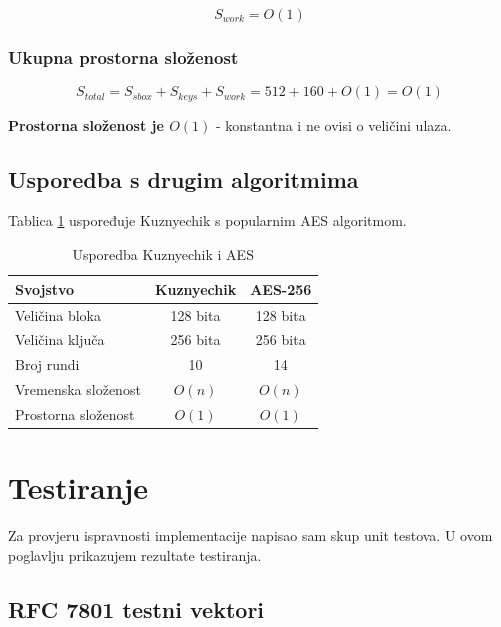\documentclass[12pt,a4paper]{article}
\begin{document}
\begin{equation}
    S_{work} = O(1)
\end{equation}

\subsubsection{Ukupna prostorna složenost}

\begin{equation}
    S_{total} = S_{sbox} + S_{keys} + S_{work} = 512 + 160 + O(1) = O(1)
\end{equation}

\textbf{Prostorna složenost je $O(1)$} - konstantna i ne ovisi o veličini ulaza.

\subsection{Usporedba s drugim algoritmima}

Tablica \ref{tab:comparison} uspoređuje Kuznyechik s popularnim AES algoritmom.

\begin{table}[H]
\centering
\caption{Usporedba Kuznyechik i AES}
\label{tab:comparison}
\begin{tabular}{|l|c|c|}
\hline
\textbf{Svojstvo} & \textbf{Kuznyechik} & \textbf{AES-256} \\
\hline
Veličina bloka & 128 bita & 128 bita \\
Veličina ključa & 256 bita & 256 bita \\
Broj rundi & 10 & 14 \\
Vremenska složenost & $O(n)$ & $O(n)$ \\
Prostorna složenost & $O(1)$ & $O(1)$ \\
\hline
\end{tabular}
\end{table}

\newpage
\section{Testiranje}

Za provjeru ispravnosti implementacije napisao sam skup unit testova. U ovom poglavlju prikazujem rezultate testiranja.

\subsection{RFC 7801 testni vektori}
\end{document}
